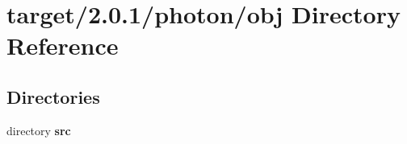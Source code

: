 \section{target/2.0.1/photon/obj Directory Reference}
\label{dir_eb85b12b181223339c6993310da30b65}
\subsection*{Directories}
\begin{DoxyCompactItemize}
\item 
directory \textbf{ src}
\end{DoxyCompactItemize}
